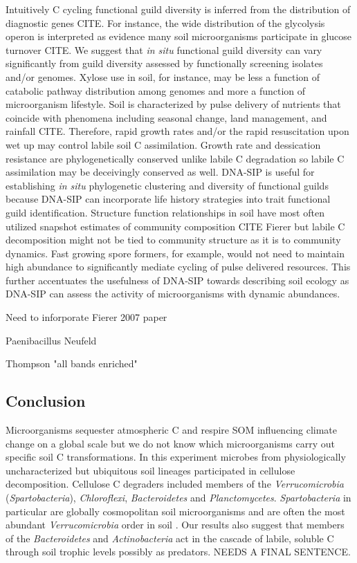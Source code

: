 Intuitively C cycling functional guild diversity is inferred from the
distribution of diagnostic genes CITE. For instance, the wide distribution of
the glycolysis operon is interpreted as evidence many soil microorganisms
participate in glucose turnover CITE. We suggest that \textit{in situ}
functional guild diversity can vary significantly from guild diversity assessed
by functionally screening isolates and/or genomes. Xylose use in soil, for
instance, may be less a function of catabolic pathway distribution among
genomes and more a function of microorganism lifestyle. Soil is characterized
by pulse delivery of nutrients that coincide with phenomena including seasonal
change, land management, and rainfall CITE. Therefore, rapid growth rates
and/or the rapid resuscitation upon wet up may control labile soil
C assimilation. Growth rate and dessication resistance are phylogenetically
conserved unlike labile C degradation so labile C assimilation may be
deceivingly conserved as well. DNA-SIP is useful for establishing \textit{in
situ} phylogenetic clustering and diversity of functional guilds because
DNA-SIP can incorporate life history strategies into trait functional guild
identification. Structure function relationships in soil have most often
utilized snapshot estimates of community composition CITE Fierer but labile
C decomposition might not be tied to community structure as it is to community
dynamics. Fast growing spore formers, for example, would not need to maintain
high abundance to significantly mediate cycling of pulse delivered resources.
This further accentuates the usefulness of DNA-SIP towards describing soil
ecology as DNA-SIP can assess the activity of microorganisms with dynamic
abundances. 

Need to inforporate Fierer 2007 paper

Paenibacillus Neufeld

Thompson "all bands enriched"

\subsection{Conclusion} 
Microorganisms sequester atmospheric C and respire SOM influencing climate
change on a global scale but we do not know which microorganisms carry out
specific soil C transformations. In this experiment microbes from
physiologically uncharacterized but ubiquitous soil lineages participated in
cellulose decomposition. Cellulose C degraders included members of the
\textit{Verrucomicrobia} (\textit{Spartobacteria}), \textit{Chloroflexi},
\textit{Bacteroidetes} and \textit{Planctomycetes}. \textit{Spartobacteria} in
particular are globally cosmopolitan soil microorganisms and are often the most
abundant \textit{Verrucomicrobia} order in soil \citep{Bergmann_2011}. Our
results also suggest that members of the \textit{Bacteroidetes} and
\textit{Actinobacteria} act in the cascade of labile, soluble C through soil
trophic levels possibly as predators. NEEDS A FINAL SENTENCE.
